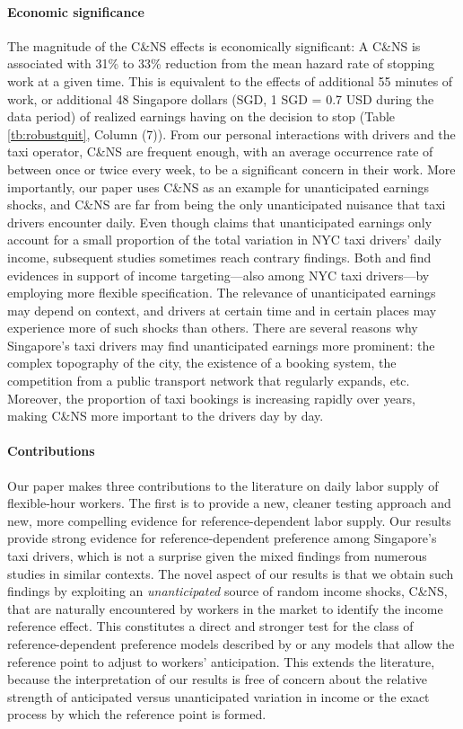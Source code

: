 \documentclass[reviewmode,AEJ]{AEA}
\begin{document}
\paragraph{Economic significance} The magnitude of the C\&NS effects is economically significant: A C\&NS
is associated with 31\% to 33\% reduction from the mean hazard rate of stopping work at a given time. 
This is equivalent to the effects of additional 55 minutes of work, or additional 48 Singapore dollars 
(SGD, 1 SGD = 0.7 USD during the data period) of realized earnings having on the decision to stop 
(Table \ref{tb:robustquit}, Column (7)). From our personal interactions with drivers and the taxi 
operator,  C\&NS are frequent enough, with an average occurrence rate of between once or twice every
week, to be a significant concern in their work. More importantly, our paper uses C\&NS as an example
for unanticipated earnings shocks, and C\&NS are far from being the only unanticipated nuisance that 
taxi drivers encounter daily. Even though \cite{farber2015you} claims that  unanticipated earnings only
account for a small proportion of the total variation in NYC taxi drivers' daily income, subsequent 
studies sometimes reach contrary findings. Both \cite{thakral2018daily} and \cite{martin2017quit} 
find evidences in support of income targeting---also among NYC taxi drivers---by employing more flexible
specification. The relevance of unanticipated earnings may depend on context, and drivers at certain time 
and in certain places may experience more of such shocks than others. There are several reasons why 
Singapore's taxi drivers may find unanticipated earnings more prominent: the complex topography of 
the city, the existence of a booking system, the competition from a public transport network that 
regularly expands, etc. Moreover, the proportion of taxi bookings is increasing rapidly over years, 
making C\&NS more important to the drivers day by day. 

\paragraph{Contributions} Our paper makes three contributions to the literature on daily labor supply 
of flexible-hour workers. The first is to provide a new, cleaner testing approach and new, more compelling
evidence for reference-dependent labor supply. Our results provide strong evidence for reference-dependent 
preference among Singapore's taxi drivers, which is not a surprise given the mixed findings from numerous 
studies in similar contexts. The novel aspect of our results is that we obtain such findings by exploiting
an \textit{unanticipated} source of random income shocks, C\&NS, that are naturally encountered by workers
in the market to identify the income reference effect. This constitutes a direct and stronger test for the
class of reference-dependent preference models described by \citet{kHoszegi2006model} or any models that 
allow the reference point to adjust to workers' anticipation. This extends the literature, because the
interpretation of our results is free of concern about the relative strength of anticipated versus 
unanticipated variation in income or the exact process by which the reference point is formed.
\end{document}

